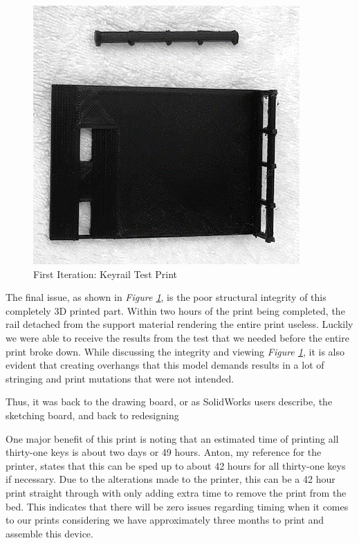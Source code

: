 \begin{figure}[h!]
  \centering
  \includegraphics[width=0.8\linewidth]{image/Print4.png}
  \caption{First Iteration: Keyrail Test Print}
  \label{fig:print4}
\end{figure}

The final issue, as shown in \textit{Figure \ref{fig:print4}}, is the poor structural integrity of this completely 3D printed part. Within two hours of the print being completed, the rail detached from the support material rendering the entire print useless. Luckily we were able to receive the results from the test that we needed before the entire print broke down. While discussing the integrity and viewing \textit{Figure \ref{fig:print4}}, it is also evident that creating overhangs that this model demands results in a lot of stringing and print mutations that were not intended.

Thus, it was back to the drawing board, or as SolidWorks users describe, the sketching board, and back to redesigning

One major benefit of this print is noting that an estimated time of printing all thirty-one keys is about two days or 49 hours. Anton, my reference for the printer, states that this can be sped up to about 42 hours for all thirty-one keys if necessary. Due to the alterations made to the printer, this can be a 42 hour print straight through with only adding extra time to remove the print from the bed. This indicates that there will be zero issues regarding timing when it comes to our prints considering we have approximately three months to print and assemble this device.

